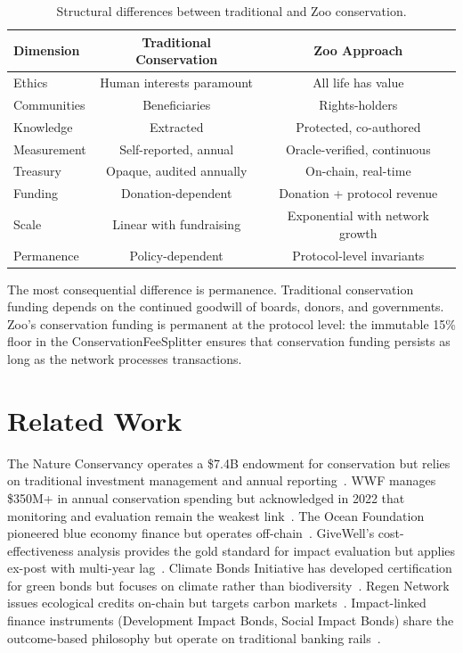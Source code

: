 \documentclass[11pt,letterpaper]{article}
\begin{document}
\begin{table}[t]
\centering
\begin{tabular}{lcc}
\toprule
\textbf{Dimension} & \textbf{Traditional Conservation} & \textbf{Zoo Approach} \\
\midrule
Ethics & Human interests paramount & All life has value \\
Communities & Beneficiaries & Rights-holders \\
Knowledge & Extracted & Protected, co-authored \\
Measurement & Self-reported, annual & Oracle-verified, continuous \\
Treasury & Opaque, audited annually & On-chain, real-time \\
Funding & Donation-dependent & Donation + protocol revenue \\
Scale & Linear with fundraising & Exponential with network growth \\
Permanence & Policy-dependent & Protocol-level invariants \\
\bottomrule
\end{tabular}
\caption{Structural differences between traditional and Zoo conservation.}
\label{tab:different}
\end{table}

The most consequential difference is permanence. Traditional conservation funding depends on the continued goodwill of boards, donors, and governments. Zoo's conservation funding is permanent at the protocol level: the immutable 15\% floor in the ConservationFeeSplitter ensures that conservation funding persists as long as the network processes transactions.

\section{Related Work}

The Nature Conservancy operates a \$7.4B endowment for conservation but relies on traditional investment management and annual reporting~\cite{tnc2023}. WWF manages \$350M+ in annual conservation spending but acknowledged in 2022 that monitoring and evaluation remain the weakest link~\cite{wwf2022}. The Ocean Foundation pioneered blue economy finance but operates off-chain~\cite{oceanfoundation2021}. GiveWell's cost-effectiveness analysis provides the gold standard for impact evaluation but applies ex-post with multi-year lag~\cite{givewell2023}. Climate Bonds Initiative has developed certification for green bonds but focuses on climate rather than biodiversity~\cite{climatebonds2023}. Regen Network issues ecological credits on-chain but targets carbon markets~\cite{regen2021}. Impact-linked finance instruments (Development Impact Bonds, Social Impact Bonds) share the outcome-based philosophy but operate on traditional banking rails~\cite{gustafsson2019}.
\end{document}
